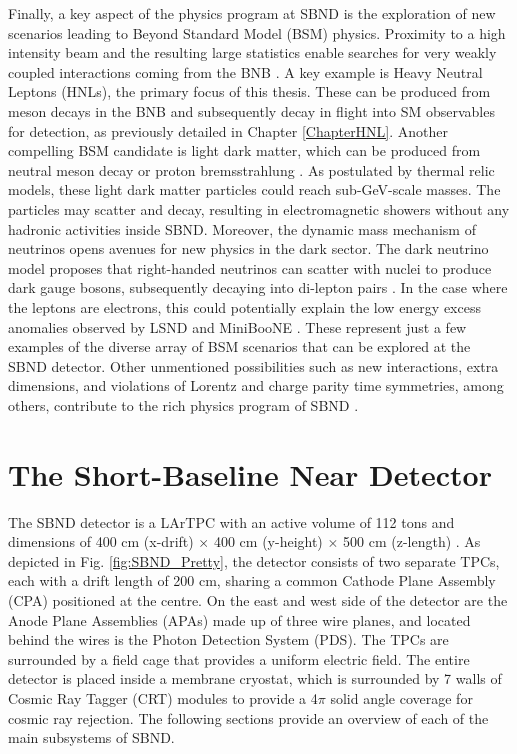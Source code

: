 Finally, a key aspect of the physics program at SBND is the exploration of new scenarios leading to Beyond Standard Model (BSM) physics. 
Proximity to a high intensity beam and the resulting large statistics enable searches for very weakly coupled interactions coming from the BNB \cite{SBNProgram}.
A key example is Heavy Neutral Leptons (HNLs), the primary focus of this thesis.
These can be produced from meson decays in the BNB and subsequently decay in flight into SM observables for detection, as previously detailed in Chapter \ref{ChapterHNL}.
Another compelling BSM candidate is light dark matter, which can be produced from neutral meson decay or proton bremsstrahlung \cite{LightDarkMatter}. 
As postulated by thermal relic models, these light dark matter particles could reach sub-GeV-scale masses. 
The particles may scatter and decay, resulting in electromagnetic showers without any hadronic activities inside SBND.
Moreover, the dynamic mass mechanism of neutrinos opens avenues for new physics in the dark sector. 
The dark neutrino model proposes that right-handed neutrinos can scatter with nuclei to produce dark gauge bosons, subsequently decaying into di-lepton pairs \cite{DarkNeutrino}. 
In the case where the leptons are electrons, this could potentially explain the low energy excess anomalies observed by LSND and MiniBooNE \cite{DarkNeutrinoLEE}.
These represent just a few examples of the diverse array of BSM scenarios that can be explored at the SBND detector. 
Other unmentioned possibilities such as new interactions, extra dimensions, and violations of Lorentz and charge parity time symmetries, among others, contribute to the rich physics program of SBND \cite{SBNProgram}.

\section{The Short-Baseline Near Detector}
\label{sec4SBND}

The SBND detector is a LArTPC with an active volume of 112 tons and dimensions of 400 cm (x-drift) $\times$ 400 cm (y-height) $\times$ 500 cm (z-length) \cite{SBNProposal}.
As depicted in Fig. \ref{fig:SBND_Pretty}, the detector consists of two separate TPCs, each with a drift length of 200 cm, sharing a common Cathode Plane Assembly (CPA) positioned at the centre.
On the east and west side of the detector are the Anode Plane Assemblies (APAs) made up of three wire planes, and located behind the wires is the Photon Detection System (PDS).
The TPCs are surrounded by a field cage that provides a uniform electric field.
The entire detector is placed inside a membrane cryostat, which is surrounded by 7 walls of Cosmic Ray Tagger (CRT) modules to provide a 4$\pi$ solid angle coverage for cosmic ray rejection.
The following sections provide an overview of each of the main subsystems of SBND.

